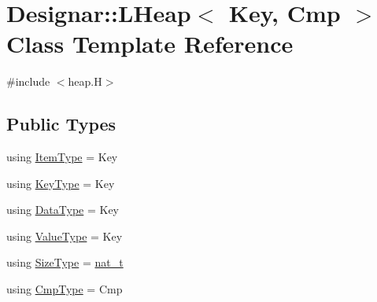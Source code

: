 \hypertarget{class_designar_1_1_l_heap}{}\section{Designar\+:\+:L\+Heap$<$ Key, Cmp $>$ Class Template Reference}
\label{class_designar_1_1_l_heap}


{\ttfamily \#include $<$heap.\+H$>$}

\subsection*{Public Types}
\begin{DoxyCompactItemize}
\item 
using \hyperlink{class_designar_1_1_l_heap_abb88755259887662cd93045937b6a045}{Item\+Type} = Key
\item 
using \hyperlink{class_designar_1_1_l_heap_a8d4160e7d11e74de54685fe905e30aa4}{Key\+Type} = Key
\item 
using \hyperlink{class_designar_1_1_l_heap_abacf82fc0de24e3d5954b075e3fb74b5}{Data\+Type} = Key
\item 
using \hyperlink{class_designar_1_1_l_heap_a7c24dbacc35909235f49057ffb3a8723}{Value\+Type} = Key
\item 
using \hyperlink{class_designar_1_1_l_heap_a2220ce9a3ac8209fda43d10778943e91}{Size\+Type} = \hyperlink{namespace_designar_aa72662848b9f4815e7bf31a7cf3e33d1}{nat\+\_\+t}
\item 
using \hyperlink{class_designar_1_1_l_heap_abb2b4f1228557317e5c3188771aea09c}{Cmp\+Type} = Cmp
\end{DoxyCompactItemize}
